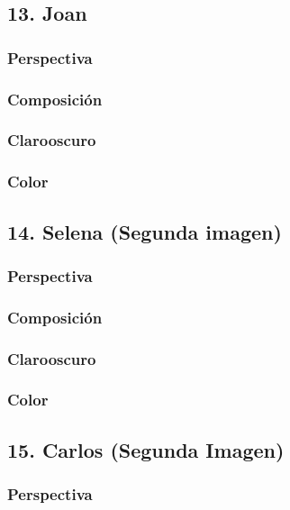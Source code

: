 \documentclass[12pt]{article}
\begin{document}
    \subsection{13. Joan}
        \subsubsection{Perspectiva}
    
        \subsubsection{Composición}
    
        \subsubsection{Clarooscuro}
    
        \subsubsection{Color}
    \subsection{14. Selena (Segunda imagen)}
        \subsubsection{Perspectiva}
    
        \subsubsection{Composición}
    
        \subsubsection{Clarooscuro}
    
        \subsubsection{Color}
    \subsection{15. Carlos (Segunda Imagen)}
        \subsubsection{Perspectiva}
    
\end{document}
